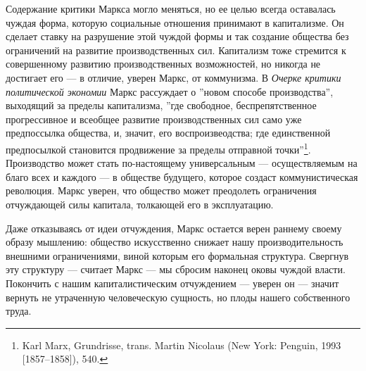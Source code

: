 \documentclass[12pt]{book}
\begin{document}
Содержание критики Маркса могло меняться, но ее целью всегда оставалась чуждая форма, которую социальные отношения принимают в капитализме. Он сделает ставку на разрушение этой чуждой формы и так создание общества без ограничений на развитие производственных сил. Капитализм тоже стремится к совершенному развитию производственных возможностей, но никогда не достигает его --- в отличие, уверен Маркс, от коммунизма. В \textit{Очерке критики политической экономии} Маркс рассуждает о ''новом способе производства'', выходящий за пределы капитализма, ''где свободное, беспрепятственное прогрессивное и всеобщее развитие производственных сил само уже предпоссылка общества, и, значит, его воспроизвеодства; где единственной предпосылкой становится продвижение за пределы отправной точки''\footnote{Karl Marx, Grundrisse, trans. Martin Nicolaus (New York: Penguin, 1993 [1857–1858]), 540.}. Производство может стать по-настоящему универсальным --- осуществляемым на благо всех и каждого --- в обществе будущего, которое создаст коммунистическая революция. Маркс уверен, что общество может преодолеть ограничения отчуждающей силы капитала, толкающей его в эксплуатацию.

Даже отказываясь от идеи отчуждения, Маркс остается верен раннему своему образу мышлению: общество искусственно снижает нашу производительность внешними ограничениями, виной которым его формальная структура. Свергнув эту структуру --- считает Маркс --- мы сбросим наконец оковы чуждой власти. Покончить с нашим капиталистическим отчуждением --- уверен он --- значит вернуть не утраченную человеческую сущность, но плоды нашего собственного труда.
\end{document}
